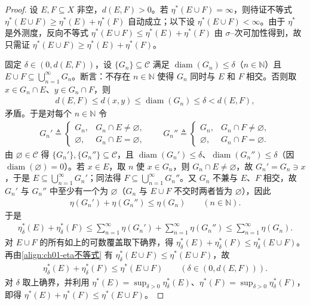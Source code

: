 \documentclass[../../main.tex]{subfiles}%
\begin{document}
\begin{proof}
设 $E,F\subseteq X$ 非空，$d(E,F)>0$。若 $\eta^*(E\cup F)=\infty$，则待证不等式 $\eta^*(E\cup F)\geqslant\eta^*(E)+\eta^*(F)$ 自动成立；以下设 $\eta^*(E\cup F)<\infty$。由于 $\eta^*$ 是外测度，反向不等式 $\eta^*(E\cup F)\leqslant\eta^*(E)+\eta^*(F)$ 由 $\sigma$--次可加性得到，故只需证 $\eta^*(E\cup F)\geqslant\eta^*(E)+\eta^*(F)$。

固定 $\delta\in(0,d(E,F))$，设 $\{G_n\}\subseteq\mathcal{C}$ 满足 $\operatorname{diam}(G_n)\leqslant\delta$（$n\in\mathbb{N}$）且 $E\cup F\subseteq\bigcup_{n=1}^\infty G_n$。断言：不存在 $n\in\mathbb{N}$ 使得 $G_n$ 同时与 $E$ 和 $F$ 相交。否则取 $x\in G_n\cap E$、$y\in G_n\cap F$，则
\begin{align*}
d(E,F)\leqslant d(x,y)\leqslant\operatorname{diam}(G_n)\leqslant\delta<d(E,F),
\end{align*}
矛盾。于是对每个 $n\in\mathbb{N}$ 令
\begin{align*}
G_n'\triangleq
\begin{cases}
G_n, & G_n\cap E\neq\varnothing,\\
\varnothing, & G_n\cap E=\varnothing,
\end{cases}
\qquad
G_n''\triangleq
\begin{cases}
G_n, & G_n\cap F\neq\varnothing,\\
\varnothing, & G_n\cap F=\varnothing.
\end{cases}
\end{align*}
由 $\varnothing\in\mathcal{C}$ 得 $\{G_n'\},\{G_n''\}\subseteq\mathcal{C}$，且 $\operatorname{diam}(G_n')\leqslant\delta$、$\operatorname{diam}(G_n'')\leqslant\delta$（因 $\operatorname{diam}(\varnothing)=0$）。若 $x\in E$，取 $n$ 使 $x\in G_n$，则 $G_n\cap E\neq\varnothing$，故 $G_n'=G_n\ni x$，于是 $E\subseteq\bigcup_{n=1}^\infty G_n'$；同法得 $F\subseteq\bigcup_{n=1}^\infty G_n''$。又 $G_n$ 不兼与 $E$、$F$ 相交，故 $G_n'$ 与 $G_n''$ 中至少有一个为 $\varnothing$（$G_n$ 与 $E\cup F$ 不交时两者皆为 $\varnothing$），因此
\begin{align*}
\eta(G_n')+\eta(G_n'')\leqslant\eta(G_n)\qquad(n\in\mathbb{N}).
\end{align*}
于是
\begin{align*}
\eta_\delta^*(E)+\eta_\delta^*(F)\leqslant\sum_{n=1}^\infty\eta(G_n')+\sum_{n=1}^\infty\eta(G_n'')\leqslant\sum_{n=1}^\infty\eta(G_n).
\end{align*}
对 $E\cup F$ 的所有如上的可数覆盖取下确界，得 $\eta_\delta^*(E)+\eta_\delta^*(F)\leqslant\eta_\delta^*(E\cup F)$。再由\eqref{align:ch01-eta不等式} 有 $\eta_\delta^*(E\cup F)\leqslant\eta^*(E\cup F)$，故
\begin{align*}
\eta_\delta^*(E)+\eta_\delta^*(F)\leqslant\eta^*(E\cup F)\qquad(\delta\in(0,d(E,F))).
\end{align*}
对 $\delta$ 取上确界，并利用 $\eta^*(E)=\sup_{\delta>0}\eta_\delta^*(E)$、$\eta^*(F)=\sup_{\delta>0}\eta_\delta^*(F)$，即得 $\eta^*(E)+\eta^*(F)\leqslant\eta^*(E\cup F)$。
\end{proof}
\end{document}
